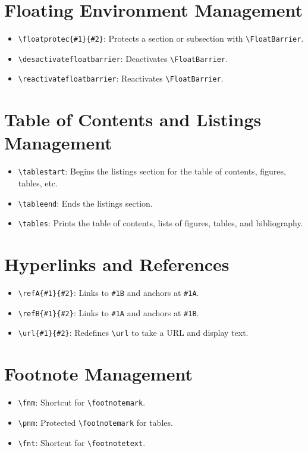 \documentclass[12pt,twoside]{report}
\begin{document}
\section{Floating Environment Management}
\begin{itemize}
    \item \verb|\floatprotec{#1}{#2}|: Protects a section or subsection with \verb|\FloatBarrier|.
    \item \verb|\desactivatefloatbarrier|: Deactivates \verb|\FloatBarrier|.
    \item \verb|\reactivatefloatbarrier|: Reactivates \verb|\FloatBarrier|.
\end{itemize}

\section{Table of Contents and Listings Management}
\begin{itemize}
    \item \verb|\tablestart|: Begins the listings section for the table of contents, figures, tables, etc.
    \item \verb|\tableend|: Ends the listings section.
    \item \verb|\tables|: Prints the table of contents, lists of figures, tables, and bibliography.
\end{itemize}

\section{Hyperlinks and References}
\begin{itemize}
    \item \verb|\refA{#1}{#2}|: Links to \verb|#1B| and anchors at \verb|#1A|.
    \item \verb|\refB{#1}{#2}|: Links to \verb|#1A| and anchors at \verb|#1B|.
    \item \verb|\url{#1}{#2}|: Redefines \verb|\url| to take a URL and display text.
\end{itemize}

\section{Footnote Management}
\begin{itemize}
    \item \verb|\fnm|: Shortcut for \verb|\footnotemark|.
    \item \verb|\pnm|: Protected \verb|\footnotemark| for tables.
    \item \verb|\fnt|: Shortcut for \verb|\footnotetext|.
\end{itemize}
\end{document}
